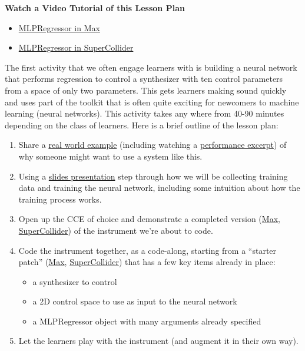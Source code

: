\documentclass{article}
\providecommand{\tightlist}{%
  \setlength{\itemsep}{0pt}\setlength{\parskip}{0pt}}
\begin{document}
\textbf{Watch a Video Tutorial of this Lesson Plan}

\begin{itemize}
\tightlist
\item
  \href{https://www.youtube.com/watch?v=XfNZzQPdPG0}{MLPRegressor in
  Max}
\item
  \href{https://www.youtube.com/watch?v=mxmMBvi3Cb0}{MLPRegressor in
  SuperCollider}
\end{itemize}

The first activity that we often engage learners with is building a
neural network that performs regression to control a synthesizer with ten control parameters from a space of only two parameters. This
gets learners making sound quickly and uses part of the toolkit that is
often quite exciting for newcomers to machine learning (neural
networks). This activity takes any where from 40-90 minutes depending on
the class of learners. Here is a brief outline of the lesson plan:

\begin{enumerate}
\def\labelenumi{\arabic{enumi}.}
\tightlist
\item
  Share a
  \href{https://f003.backblazeb2.com/file/learnassets/examples/teaching-material/regressor-example.pdf}{real
  world example} (including watching a
  \href{https://vimeo.com/565771489}{performance excerpt}) of why
  someone might want to use a system like this.
\item
  Using a
  \href{https://f003.backblazeb2.com/file/learnassets/examples/teaching-material/regressor-process.pdf}{slides
  presentation} step through how we will be collecting training data and
  training the neural network, including some intuition about how the
  training process works.
\item
  Open up the CCE of choice and demonstrate a completed version
  (\href{https://learn.flucoma.org/examples/regressor-video-demo.maxpat}{Max},
  \href{https://learn.flucoma.org/examples/regressor-video-complete-server.scd}{SuperCollider})
  of the instrument we're about to code.
\item
  Code the instrument together, as a code-along, starting from a
  ``starter patch''
  (\href{https://learn.flucoma.org/examples/regressor-video-starter.maxpat}{Max},
  \href{https://learn.flucoma.org/examples/regressor-video-starter.scd}{SuperCollider})
  that has a few key items already in place:

  \begin{itemize}
  \tightlist
  \item
    a synthesizer to control
  \item
    a 2D control space to use as input to the neural network
  \item
    a MLPRegressor object with many arguments already specified
  \end{itemize}
\item
  Let the learners play with the instrument (and augment it in their own
  way).
\end{enumerate}
\end{document}
